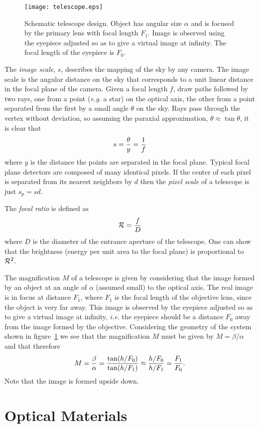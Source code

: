 \begin{figure}[th]
	\centering
	\texttt{[image: telescope.eps]}
  \caption{Schematic telescope design. Object has angular size $\alpha$ and is focused by 
the primary lens with focal length $F_1$. Image is observed using the eyepiece adjusted so
as to give a virtual image at infinity. The focal length of the eyepiece is $F_0$. }
  \label{fig:telescope}
\end{figure}

The {\it image scale}, $s$, describes the mapping of the sky by any camera. The image scale
is the angular distance on the sky that corresponds to a unit linear distance in the focal 
plane of the camera. Given a focal length $f$, draw paths followed by two rays, one from 
a point ({\it e.g.} a star) on the optical axis, the other from a point separated from the 
first by a small angle $\theta$ on the sky. Rays pass through the vertex without 
deviation, so assuming the paraxial approximation, $\theta\approx\tan\theta$, it is clear that
\[
s={\theta\over y}={1\over f}
\]
where $y$ is the distance the points are separated in the focal plane. Typical focal plane 
detectors are composed of many identical pixels. If the center of each pixel is separated 
from its nearest neighbors by $d$ then the {\it pixel scale} of a telescope is just $s_p=sd$.

The {\it focal ratio} is defined as 
\[
{\cal R}={f\over D}
\]
where $D$ is the diameter of the entrance aperture of the telescope. One can show that the 
brightness (energy per unit area to the focal plane) is proportional to ${\cal R}^2$.

The magnification $M$ of a telescope is given by considering that the image
formed by an object at an angle of $\alpha$ (assumed small) to the optical axis.
The real image is in focus at distance $F_1$, where $F_1$ is the focal length of the
objective lens, since the object is very far away. This image is observed by the eyepiece 
adjusted so as to give a virtual image at infinity, {\it i.e.} the eyepiece should be a distance
$F_0$ away from the image formed by the objective. Considering the geometry of the 
system shown in figure~\ref{fig:telescope} we see that the magnification $M$ must 
be given by $M={\beta/\alpha}$ and that therefore
\[ M={\beta\over\alpha}={\tan({h/F_0})\over\tan({h/F_1})}\approx{{h/F_0}\over{h/F_1}}={F_1\over F_0}.\]
Note that the image is formed upside down.

\section{Optical Materials}


